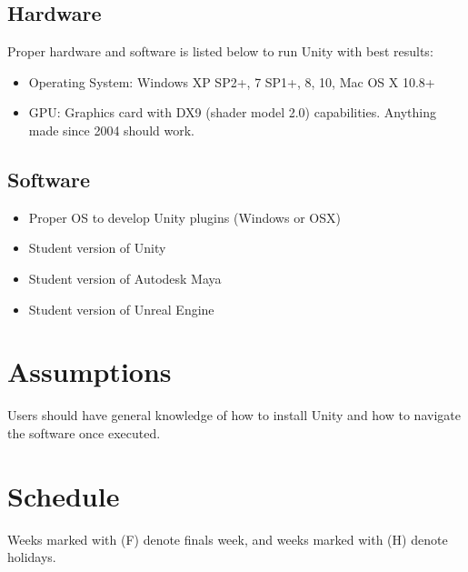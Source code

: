 \documentclass[12pt]{article}
\begin{document}
\subsection{Hardware}
Proper hardware and software is listed below to run Unity with best results:
\begin{itemize}
 \item Operating System: Windows XP SP2+, 7 SP1+, 8, 10, Mac OS X 10.8+
 \item GPU: Graphics card with DX9 (shader model 2.0) capabilities. Anything made since 2004 should work.
\end{itemize}

\subsection{Software}
\begin{itemize}
 \item Proper OS to develop Unity plugins (Windows or OSX)
 \item Student version of Unity
 \item Student version of Autodesk Maya
 \item Student version of Unreal Engine
\end{itemize}

\section{Assumptions}
\label{sec:assumptions}
Users should have general knowledge of how to install Unity and how to navigate the software once executed.

\section{Schedule}
\label{sec:schedule}
Weeks marked with (F) denote finals week, and weeks marked with (H) denote holidays.
\end{document}
